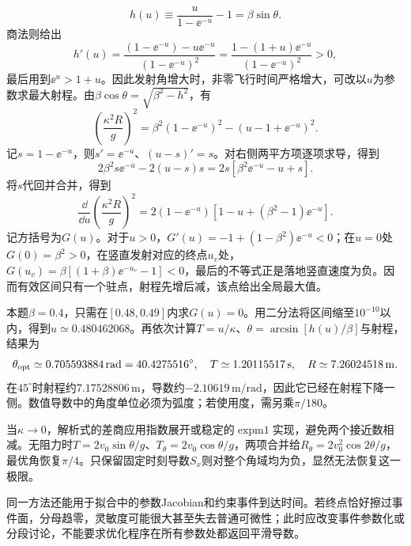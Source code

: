 \begin{solution}
\[
h(u)\equiv\frac{u}{1-\ee^{-u}}-1=\beta\sin\theta.
\]
商法则给出
\[h'(u)=\frac{(1-\ee^{-u})-u\ee^{-u}}{(1-\ee^{-u})^2}
=\frac{1-(1+u)\ee^{-u}}{(1-\ee^{-u})^2}>0,\]
最后用到$\ee^u>1+u$。因此发射角增大时，非零飞行时间严格增大，可改以$u$为参数求最大射程。由$\beta\cos\theta=\sqrt{\beta^2-h^2}$，有
\[
\left(\frac{\kappa^2R}{g}\right)^2
=\beta^2(1-\ee^{-u})^2-(u-1+\ee^{-u})^2.
\]
记$s=1-\ee^{-u}$，则$s'=\ee^{-u}$、$(u-s)'=s$。对右侧两平方项逐项求导，得到
\[2\beta^2s\ee^{-u}-2(u-s)s
=2s[\beta^2\ee^{-u}-u+s].\]
将$s$代回并合并，得到
\[
\frac{\dd}{\dd u}\left(\frac{\kappa^2R}{g}\right)^2
=2(1-\ee^{-u})[1-u+(\beta^2-1)\ee^{-u}].
\]
记方括号为$G(u)$。对于$u>0$，$G'(u)=-1+(1-\beta^2)\ee^{-u}<0$；在$u=0$处$G(0)=\beta^2>0$，在竖直发射对应的终点$u_v$处，
$G(u_v)=\beta[(1+\beta)\ee^{-u_v}-1]<0$，最后的不等式正是落地竖直速度为负。因而有效区间只有一个驻点，射程先增后减，该点给出全局最大值。

本题$\beta=0.4$，只需在$[0.48,0.49]$内求$G(u)=0$。用二分法将区间缩至$10^{-10}$以内，得到$u\simeq0.480462068$。再依次计算$T=u/\kappa$、$\theta=\arcsin[h(u)/\beta]$与射程，结果为
\[
 \theta_{\rm opt}\simeq0.705593884\,\mathrm{rad}
 =40.4275516^\circ,\quad
 T\simeq1.20115517\,\mathrm s,\quad R\simeq7.26024518\,\mathrm m.
\]
在$45^\circ$时射程约$7.17528806\,\mathrm m$，导数约$-2.10619\,\mathrm{m/rad}$，因此它已经在射程下降一侧。数值导数中的角度单位必须为弧度；若使用度，需另乘$\pi/180$。

当$\kappa\to0$，解析式的差商应用指数展开或稳定的$\operatorname{expm1}$实现，避免两个接近数相减。无阻力时$T=2v_0\sin\theta/g$、$T_\theta=2v_0\cos\theta/g$，两项合并给$R_\theta=2v_0^2\cos2\theta/g$，最优角恢复$\pi/4$。只保留固定时刻导数$S_x$则对整个角域均为负，显然无法恢复这一极限。
\end{solution}

同一方法还能用于拟合中的参数Jacobian和约束事件到达时间。若终点恰好擦过事件面，分母趋零，灵敏度可能很大甚至失去普通可微性；此时应改变事件参数化或分段讨论，不能要求优化程序在所有参数处都返回平滑导数。
